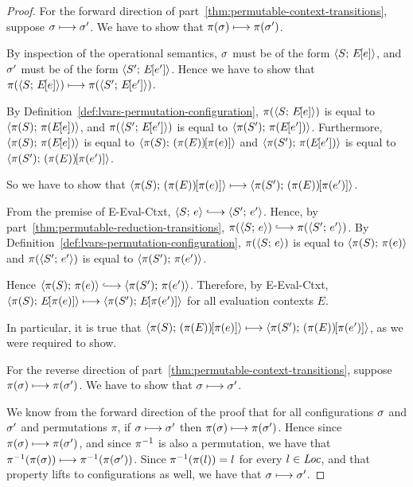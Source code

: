 \begin{proof}

  For the forward direction of
  part~\ref{thm:permutable-context-transitions}, suppose $\sigma
  \longmapsto \sigma'$.  We have to show that $\pi(\sigma) \longmapsto
  \pi(\sigma')$.

  By inspection of the operational semantics, $\sigma$ must be of the
  form $\langle S;\, E\hspace{-1mm}\left[e\right] \rangle$, and $\sigma'$ must be of the form
  $\langle S';\, E\hspace{-1mm}\left[e'\right] \rangle$.  Hence we have to show that
  $\pi(\langle S;\, E\hspace{-1mm}\left[e\right] \rangle) \longmapsto \pi(\langle S';\, E\hspace{-1mm}\left[e'\right] \rangle)$.

  By Definition~\ref{def:lvars-permutation-configuration},
  $\pi(\langle S;\, E\hspace{-1mm}\left[e\right] \rangle)$ is equal to $\langle \pi(S);\, \pi(E\hspace{-1mm}\left[e\right]) \rangle$,
  and $\pi(\langle S';\, E\hspace{-1mm}\left[e'\right] \rangle)$ is equal to
  $\langle \pi(S');\, \pi(E\hspace{-1mm}\left[e'\right]) \rangle$.  Furthermore,
  $\langle \pi(S);\, \pi(E\hspace{-1mm}\left[e\right]) \rangle$ is equal to
  $\langle \pi(S);\, (\pi(E))\hspace{-1mm}\left[\pi(e)\right] \rangle$ and
  $\langle \pi(S');\, \pi(E\hspace{-1mm}\left[e'\right]) \rangle$ is equal to
  $\langle \pi(S');\, (\pi(E))\hspace{-1mm}\left[\pi(e')\right] \rangle$.

  So we have to show that
  $\langle \pi(S);\, (\pi(E))\hspace{-1mm}\left[\pi(e)\right] \rangle \longmapsto
  \langle \pi(S');\, (\pi(E))\hspace{-1mm}\left[\pi(e')\right] \rangle$.

  From the premise of {\sc E-Eval-Ctxt}, $\config{S}{e} \parstepsto
  \config{S'}{e'}$.  Hence, by
  part~\ref{thm:permutable-reduction-transitions}, $\pi(\config{S}{e})
  \parstepsto \pi(\config{S'}{e'})$.  By
  Definition~\ref{def:lvars-permutation-configuration},
  $\pi(\langle S;\, e \rangle)$ is equal to $\langle \pi(S);\, \pi(e) \rangle$ and
  $\pi(\langle S';\, e' \rangle)$ is equal to $\langle \pi(S');\, \pi(e') \rangle$.

  Hence $\config{\pi(S)}{\pi(e)} \parstepsto
  \config{\pi(S')}{\pi(e')}$.  Therefore, by {\sc E-Eval-Ctxt},
  $\langle \pi(S);\, E\hspace{-1mm}\left[\pi(e)\right] \rangle \longmapsto
  \langle \pi(S');\, E\hspace{-1mm}\left[\pi(e')\right] \rangle$ for all evaluation contexts $E$.

  In particular, it is true that
  $\langle \pi(S);\, (\pi(E))\hspace{-1mm}\left[\pi(e)\right] \rangle \longmapsto
  \langle \pi(S');\, (\pi(E))\hspace{-1mm}\left[\pi(e')\right] \rangle$, as we were required
  to show.

  For the reverse direction of
  part~\ref{thm:permutable-context-transitions}, suppose $\pi(\sigma)
  \longmapsto \pi(\sigma')$.  We have to show that $\sigma \longmapsto
  \sigma'$.

  We know from the forward direction of the proof that for all
  configurations $\sigma$ and $\sigma'$ and permutations $\pi$, if
  $\sigma \longmapsto \sigma'$ then $\pi(\sigma) \longmapsto
  \pi(\sigma')$.  Hence since $\pi(\sigma) \longmapsto \pi(\sigma')$, and
  since $\pi^{-1}$ is also a permutation, we have that
  $\pi^{-1}(\pi(\sigma)) \longmapsto \pi^{-1}(\pi(\sigma'))$.  Since
  $\pi^{-1}(\pi(l)) = l$ for every $l \in \mathit{Loc}$, and that property lifts
  to configurations as well, we have that $\sigma \longmapsto \sigma'$.

\end{proof}
